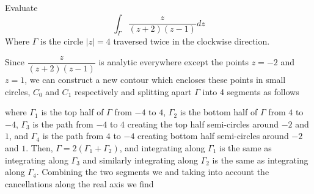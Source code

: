 \documentclass[12pt]{article}
\author{Warren Atkison}
\date{\today}
\newenvironment{exercise}[2][Exercise]{\begin{trivlist}
\item[\hskip \labelsep {\bfseries #1} \hskip \labelsep {\bfseries #2.}]}{\end{trivlist}}
\begin{document}
\fancyhf{}
\fancyhead[R]{\today}
\fancyfoot[R]{\thepage}

\begin{exercise}{15}
	Evaluate
	\[
		\int_{\Gamma} \frac{z}{(z + 2)(z - 1)}dz
	\]
	Where $\Gamma$ is the circle $|z| = 4$ traversed twice in the clockwise direction.
\end{exercise}
Since $\dfrac{z}{(z + 2)(z - 1)}$ is analytic everywhere except the points $z = -2$ and $z = 1$, we can construct a new contour which encloses these points in small circles, $C_0$ and $C_1$ respectively and splitting apart $\Gamma$ into 4 segments as follows
\begin{center}
\end{center}
where $\Gamma_1$ is the top half of $\Gamma$ from $-4$ to $4$, $\Gamma_2$ is the bottom half of $\Gamma$ from $4$ to $-4$, $\Gamma_3$ is the path from $-4$ to $4$ creating the top half semi-circles around $-2$ and $1$, and $\Gamma_4$ is the path from $4$ to $-4$ creating bottom half semi-circles around $-2$ and $1$. Then, $\Gamma =2(\Gamma_1 + \Gamma_2)$, and integrating along $\Gamma_1$ is the same as integrating along $\Gamma_3$ and similarly integrating along $\Gamma_2$ is the same as integrating along $\Gamma_4$. Combining the two segments we and taking into account the cancellations along the real axis we find
\end{document}
